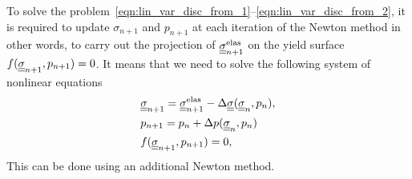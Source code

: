 \documentclass[12pt]{article}
\begin{document}
To solve the problem~\eqref{eqn:lin_var_disc_from_1}--\eqref{eqn:lin_var_disc_from_2}, it is required to update $\sigma_{n+1}$ and $p_{n+1}$ at each iteration of the Newton method in other words, to carry out the projection of $\underline{\underline{\sigma}}_{n+1}^{\text{elas}}$ on the yield surface $f(\underline{\underline{\sigma}}_{n+1}, p_{n+1}) = 0$. It means that we need to solve the following system of nonlinear equations
\begin{align}
    & \underline{\underline{\sigma}}_{n+1} = \underline{\underline{\sigma}}_{n+1}^{\text{elas}} - \Delta\underline{\underline{\sigma}}(\underline{\underline{\sigma}}_n, p_n), \\\label{eqn:return-mapping_Newton_begin}
    & p_{n+1} = p_n + \Delta p(\underline{\underline{\sigma}}_n, p_n) \\
    & f(\underline{\underline{\sigma}}_{n+1}, p_{n+1}) = 0, \label{eqn:return-mapping_Newton_end}
\end{align} 
This can be done using an additional Newton method.
\end{document}
